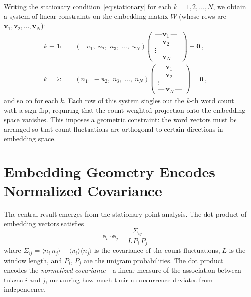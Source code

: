 \documentclass[11pt]{article}
\newcommand{\vw}{\bm{v}}
\newcommand{\ew}{\bm{e}}
\begin{document}
Writing the stationary condition~\eqref{eq:stationary} for each $k = 1, 2, \ldots, N$, we obtain a system of linear constraints on the embedding matrix $W$ (whose rows are $\vw_1, \vw_2, \ldots, \vw_N$):
\begin{equation}\label{eq:matrix-constraint}
\begin{aligned}
    k{=}1: &\quad (-n_1,\; n_2,\; n_3,\; \ldots,\; n_N) \begin{pmatrix} \text{---}\, \vw_1 \,\text{---} \\ \text{---}\, \vw_2 \,\text{---} \\ \vdots \\ \text{---}\, \vw_N \,\text{---} \end{pmatrix} = \bm{0}\,, \\[6pt]
    k{=}2: &\quad (n_1,\; -n_2,\; n_3,\; \ldots,\; n_N) \begin{pmatrix} \text{---}\, \vw_1 \,\text{---} \\ \text{---}\, \vw_2 \,\text{---} \\ \vdots \\ \text{---}\, \vw_N \,\text{---} \end{pmatrix} = \bm{0}\,,
\end{aligned}
\end{equation}
and so on for each $k$. Each row of this system singles out the $k$-th word count with a sign flip, requiring that the count-weighted projection onto the embedding space vanishes. This imposes a geometric constraint: the word vectors must be arranged so that count fluctuations are orthogonal to certain directions in embedding space.

\section{Embedding Geometry Encodes Normalized Covariance}\label{sec:geometry}

The central result emerges from the stationary-point analysis. The dot product of embedding vectors satisfies
\begin{equation}\label{eq:main-result}
    \boxed{\;\ew_i \cdot \ew_j = \frac{\Sigma_{ij}}{L\, P_i\, P_j}\;\,}
\end{equation}
where $\Sigma_{ij} = \langle n_i\, n_j \rangle - \langle n_i \rangle \langle n_j \rangle$ is the covariance of the count fluctuations, $L$ is the window length, and $P_i$, $P_j$ are the unigram probabilities. The dot product encodes the \emph{normalized covariance}---a linear measure of the association between tokens $i$ and $j$, measuring how much their co-occurrence deviates from independence.
\end{document}
